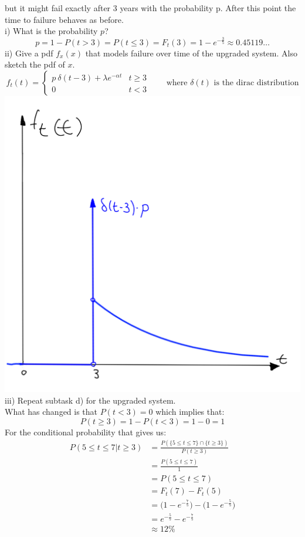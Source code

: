 \documentclass[a4paper,footsepline]{scrartcl}
\begin{document}
	but it might fail exactly after 3 years with the probability p. After this point the time
	to failure behaves as before.\\
	i) What is the probability $p$?\\
	\[ p = 1 - P(t > 3) = P(t \leq 3) = F_t(3) = 1 - e^{-\frac{3}{5}} \approx 0.45119 \dots \]
	ii) Give a pdf $f_ x(x)$ that models failure over time of the upgraded system. Also sketch
	the pdf of $x$.\\
	\[f_t(t) = \begin{cases} 
	p\ \delta(t-3) + \lambda e^{-\alpha t} & t \geq 3\\
	0 & t < 3
	\end{cases} \qquad \text{where } \delta(t) \text{ is the dirac distribution} \]
	\includegraphics[width=\textwidth]{sketch2.png}
	iii) Repeat subtask d) for the upgraded system.\vspace{0.2cm}\\
	What has changed is that $P(t < 3)=0$ which implies that:\\ 
	\[P(t \geq 3) = 1-P(t < 3) = 1-0 =1\]
	For the conditional probability that gives us:
	\begin{align*}
	P(5 \leq t \leq 7 | t \geq 3) &= \frac{P(\{5 \leq t \leq 7\} \cap \{t \geq 3\} ) }{P(t \geq 3)}\\
	&= \frac{P(5 \leq t \leq 7)}{1}\\
	&= P(5 \leq t \leq 7)\\
	&= F_t(7) - F_t(5)\\
	&=\big(1-e^{-\frac{7}{5}}\big) - \big(1-e^{-\frac{5}{5}}\big)\\
	&= e^{-\frac{5}{5}}-e^{-\frac{7}{5}}\\
	&\approx 12\%
	\end{align*}
\end{document}

